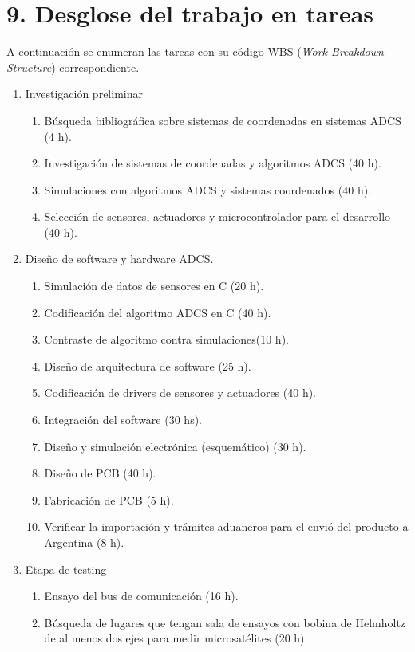 \documentclass[
11pt, %
]{charter}
\begin{document}
\section{9. Desglose del trabajo en tareas}
\label{sec:wbs}
	A continuación se enumeran las tareas con su código WBS (\textit{Work Breakdown Structure}) correspondiente.  
\begin{enumerate}
	\item Investigación preliminar
		\begin{enumerate}
			\item Búsqueda bibliográfica sobre sistemas de coordenadas en sistemas ADCS (4 h). 
			\item Investigación de sistemas de coordenadas y algoritmos ADCS (40 h).
			\item Simulaciones con algoritmos ADCS y sistemas coordenados (40 h).   
			\item Selección de sensores, actuadores y microcontrolador para el desarrollo (40 h).					
		\end{enumerate}
	\item Diseño de software y hardware ADCS. 
		\begin{enumerate}
			\item Simulación de datos de sensores en C (20 h).
			\item Codificación del algoritmo ADCS en C (40 h). 
			\item Contraste de algoritmo contra simulaciones(10 h). 
			\item Diseño de arquitectura de software (25 h). 
			\item Codificación de drivers de sensores y actuadores (40 h). 
			\item Integración del software (30 hs). 
			\item Diseño y simulación electrónica (esquemático)  (30 h). 
			\item Diseño de PCB  (40 h). 
			\item Fabricación de PCB  (5 h). 
			\item Verificar la importación y trámites aduaneros para el envió del producto a Argentina (8 h). 
		\end{enumerate}
	\item Etapa de testing
		\begin{enumerate}
			\item Ensayo del bus de comunicación (16 h). 
			\item Búsqueda de lugares que tengan sala de ensayos  con bobina de Helmholtz de al menos dos ejes para medir microsatélites (20 h).

\end{enumerate}
\end{enumerate}
\end{document}
